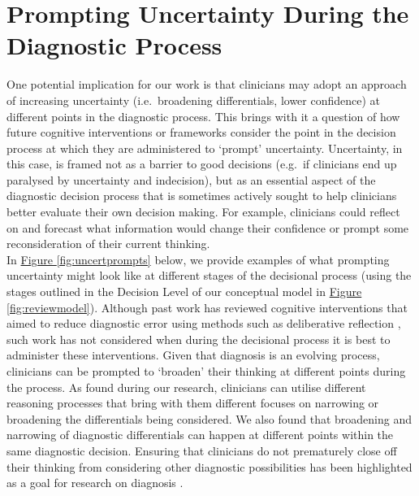 \documentclass[a4paper, nobind]{templates/ociamthesis}
\begin{document}
\section{Prompting Uncertainty During the Diagnostic Process}\label{prompting-uncertainty-during-the-diagnostic-process}

One potential implication for our work is that clinicians may adopt an approach of increasing uncertainty (i.e.~broadening differentials, lower confidence) at different points in the diagnostic process. This brings with it a question of how future cognitive interventions or frameworks consider the point in the decision process at which they are administered to `prompt' uncertainty. Uncertainty, in this case, is framed not as a barrier to good decisions (e.g.~if clinicians end up paralysed by uncertainty and indecision), but as an essential aspect of the diagnostic decision process that is sometimes actively sought to help clinicians better evaluate their own decision making. For example, clinicians could reflect on and forecast what information would change their confidence or prompt some reconsideration of their current thinking.\\

In \hyperref[fig:uncertprompts]{Figure \ref{fig:uncertprompts}} below, we provide examples of what prompting uncertainty might look like at different stages of the decisional process (using the stages outlined in the Decision Level of our conceptual model in \hyperref[fig:reviewmodel]{Figure \ref{fig:reviewmodel}}). Although past work has reviewed cognitive interventions that aimed to reduce diagnostic error \autocite{graber_cognitive_2012,lambe_dual-process_2016,dave_interventions_2022} using methods such as deliberative reflection \autocite{norman_etiology_2014,lambe_guided_2018,costa_filho_effects_2019,kuhn_learning_2023}, such work has not considered when during the decisional process it is best to administer these interventions. Given that diagnosis is an evolving process, clinicians can be prompted to `broaden' their thinking at different points during the process. As found during our research, clinicians can utilise different reasoning processes that bring with them different focuses on narrowing or broadening the differentials being considered. We also found that broadening and narrowing of diagnostic differentials can happen at different points within the same diagnostic decision. Ensuring that clinicians do not prematurely close off their thinking from considering other diagnostic possibilities has been highlighted as a goal for research on diagnosis \autocite{krupat_avoiding_2017}.
\end{document}
